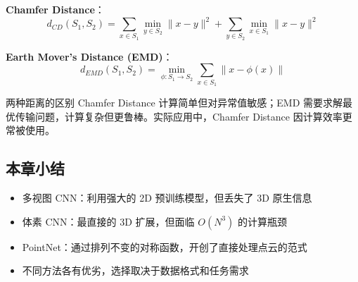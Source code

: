 \textbf{Chamfer Distance}：
$$d_{CD}(S_1, S_2) = \sum_{x \in S_1} \min_{y \in S_2} \|x - y\|^2 + \sum_{y \in S_2} \min_{x \in S_1} \|x - y\|^2$$

\textbf{Earth Mover's Distance (EMD)}：
$$d_{EMD}(S_1, S_2) = \min_{\phi: S_1 \to S_2} \sum_{x \in S_1} \|x - \phi(x)\|$$

\begin{knowledgebox}{两种距离的区别}
Chamfer Distance 计算简单但对异常值敏感；EMD 需要求解最优传输问题，计算复杂但更鲁棒。实际应用中，Chamfer Distance 因计算效率更常被使用。
\end{knowledgebox}

\subsection{本章小结}

\begin{itemize}
    \item 多视图 CNN：利用强大的 2D 预训练模型，但丢失了 3D 原生信息
    \item 体素 CNN：最直接的 3D 扩展，但面临 $O(N^3)$ 的计算瓶颈
    \item PointNet：通过排列不变的对称函数，开创了直接处理点云的范式
    \item 不同方法各有优劣，选择取决于数据格式和任务需求
\end{itemize}


